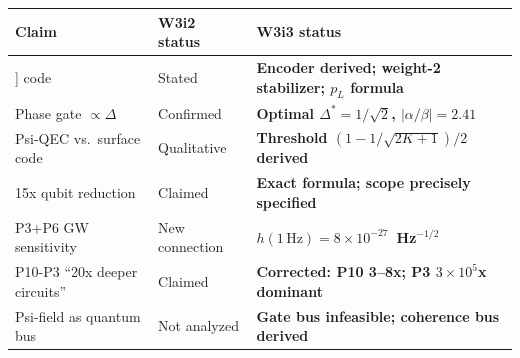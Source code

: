 \documentclass[11pt]{article}
\theoremstyle{definition}
\theoremstyle{remark}
\begin{document}
\begin{center}
\begin{tabular}{lll}
\toprule
Claim & W3i2 status & W3i3 status \\
\midrule
[[2K+1,1,K+1]] code & Stated & \textbf{Encoder derived; weight-2 stabilizer; $p_L$ formula} \\
Phase gate $\propto\Delta$ & Confirmed & \textbf{Optimal $\Delta^* = 1/\sqrt{2}$, $|\alpha/\beta|=2.41$} \\
Psi-QEC vs.\ surface code & Qualitative & \textbf{Threshold $(1-1/\sqrt{2K+1})/2$ derived} \\
15x qubit reduction & Claimed & \textbf{Exact formula; scope precisely specified} \\
P3+P6 GW sensitivity & New connection & \textbf{$h(1\,\mathrm{Hz})=8\times10^{-27}$~Hz$^{-1/2}$} \\
P10-P3 ``20x deeper circuits'' & Claimed & \textbf{Corrected: P10 3--8x; P3 $3\times10^5$x dominant} \\
Psi-field as quantum bus & Not analyzed & \textbf{Gate bus infeasible; coherence bus derived} \\
\bottomrule
\end{tabular}
\end{center}
\end{document}
